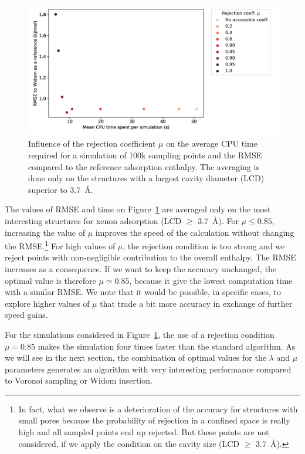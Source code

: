 \documentclass[main]{subfiles}
\begin{document}
\begin{figure}[ht]
\centering
  \includegraphics[width=0.7\linewidth]{figures/3-fastsim/rejection_coeff_optimisation.png}
  \caption{Influence of the rejection coefficient $\mu$ on the average CPU time required for a simulation of 100k sampling points and the RMSE compared to the reference adsorption enthalpy. The averaging is done only on the structures with a largest cavity diameter (LCD) superior to \SI{3.7}{\angstrom}. }
  \label{fgr:rejection}
\end{figure}

The values of RMSE and time on Figure~\ref{fgr:rejection} are averaged only on the most interesting structures for xenon adsorption (LCD $\geq$ \SI{3.7}{\angstrom}). For $\mu\leq 0.85$, increasing the value of $\mu$ improves the speed of the calculation without changing the RMSE.\footnote{In fact, what we observe is a deterioration of the accuracy for structures with small pores because the probability of rejection in a confined space is really high and all sampled points end up rejected. But these points are not considered, if we apply the condition on the cavity size (LCD $\geq$ \SI{3.7}{\angstrom}).} For high values of $\mu$, the rejection condition is too strong and we reject points with non-negligible contribution to the overall enthalpy. The RMSE increases as a consequence. If we want to keep the accuracy unchanged, the optimal value is therefore $\mu \simeq 0.85$, because it give the lowest computation time with a similar RMSE. We note that it would be possible, in specific cases, to explore higher values of $\mu$ that trade a bit more accuracy in exchange of further speed gains.

For the simulations considered in Figure~\ref{fgr:rejection}, the use of a rejection condition $\mu = 0.85$ makes the simulation four times faster than the standard algorithm. As we will see in the next section, the combination of optimal values for the $\lambda$ and $\mu$ parameters generates an algorithm with very interesting performance compared to Voronoi sampling or Widom insertion.
\end{document}
